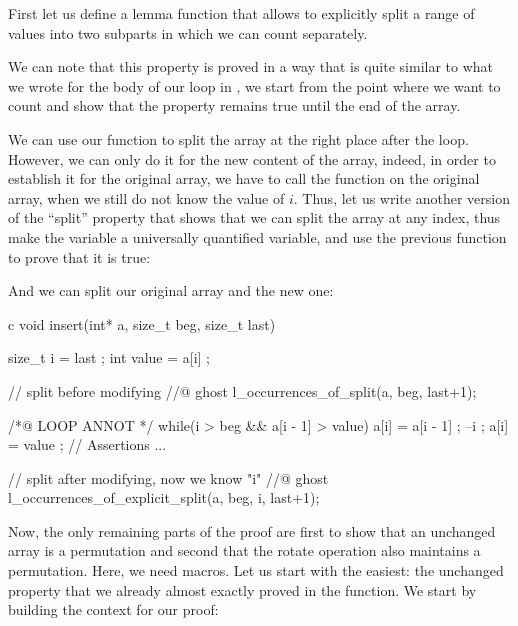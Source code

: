 First let us define a lemma function that allows to explicitly split a range of
values into two subparts in which we can count separately.




We can note that this property is proved in a way that is quite similar to what
we wrote for the body of our loop in , we start from
the point where we want to count and show that the property remains true until
the end of the array.



We can use our function to split the array at the right place after the loop.
However, we can only do it for the new content of the array, indeed, in order to
establish it for the original array, we have to call the function on the
original array, when we still do not know the value of $i$. Thus, let us write
another version of the ``split'' property that shows that we can split the
array at any index, thus make the  variable a universally
quantified variable, and use the previous function to prove that it is true:




And we can split our original array and the new one:


\begin{CodeBlock}{c}
void insert(int* a, size_t beg, size_t last){
  size_t i = last ;
  int value = a[i] ;

  // split before modifying
  //@ ghost l_occurrences_of_split(a, beg, last+1);

  /*@ LOOP ANNOT */
  while(i > beg && a[i - 1] > value){
    a[i] = a[i - 1] ;
    --i ;
  }
  a[i] = value ;
  // Assertions ...

  // split after modifying, now we know "i"
  //@ ghost l_occurrences_of_explicit_split(a, beg, i, last+1);
}
\end{CodeBlock}


Now, the only remaining parts of the proof are first to show that an unchanged
array is a permutation and second that the rotate operation also maintains a
permutation. Here, we need macros. Let us start with the easiest: the unchanged
property that we already almost exactly proved in the
 function. We start by building the context for our
proof:




